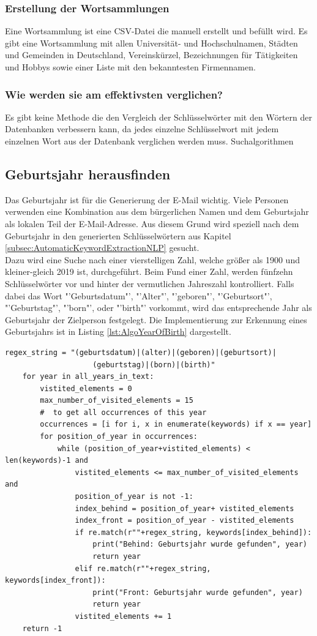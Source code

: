		\subsubsection{Erstellung der Wortsammlungen}	
		Eine Wortsammlung ist eine CSV-Datei die manuell erstellt und befüllt wird. Es gibt eine Wortsammlung mit allen Universität- und Hochschulnamen, Städten und Gemeinden in Deutschland, Vereinskürzel, Bezeichnungen für Tätigkeiten und Hobbys sowie einer Liste mit den bekanntesten Firmennamen. 
		\subsubsection{Wie werden sie am effektivsten verglichen?}
		Es gibt keine Methode die den Vergleich der Schlüsselwörter mit den Wörtern der Datenbanken verbessern kann, da jedes einzelne Schlüsselwort mit jedem einzelnen Wort aus der Datenbank verglichen werden muss. Suchalgorithmen
		
	\subsection{Geburtsjahr herausfinden}
	Das Geburtsjahr ist für die Generierung der E-Mail wichtig. Viele Personen verwenden eine Kombination aus dem bürgerlichen Namen und dem Geburtsjahr als lokalen Teil der E-Mail-Adresse. Aus diesem Grund wird speziell nach dem Geburtsjahr in den generierten Schlüsselwörtern aus Kapitel \ref{subsec:AutomaticKeywordExtractionNLP} gesucht.\\
	Dazu wird eine Suche nach einer vierstelligen Zahl, welche größer als 1900 und kleiner-gleich 2019 ist, durchgeführt. Beim Fund einer Zahl, werden  fünfzehn Schlüsselwörter vor und hinter der vermutlichen Jahreszahl kontrolliert. Falls dabei das Wort "'Geburtsdatum"', "'Alter"', "'geboren"', "'Geburtsort"', "'Geburtstag"', "'born"', oder "'birth"' vorkommt, wird das entsprechende Jahr als Geburtsjahr der Zielperson festgelegt. Die Implementierung zur Erkennung eines Geburtsjahrs ist in Listing \ref{lst:AlgoYearOfBirth} dargestellt.\\
	
	\begin{lstlisting}[caption=Geburtsdatum herauslesen,label={lst:AlgoYearOfBirth}]
	regex_string = "(geburtsdatum)|(alter)|(geboren)|(geburtsort)|	
					(geburtstag)|(born)|(birth)"
	for year in all_years_in_text:
		vistited_elements = 0
		max_number_of_visited_elements = 15
		#  to get all occurrences of this year
		occurrences = [i for i, x in enumerate(keywords) if x == year]
		for position_of_year in occurrences:
			while (position_of_year+vistited_elements) < len(keywords)-1 and
				vistited_elements <= max_number_of_visited_elements and
				position_of_year is not -1:
				index_behind = position_of_year+ vistited_elements
				index_front = position_of_year - vistited_elements
				if re.match(r""+regex_string, keywords[index_behind]):
					print("Behind: Geburtsjahr wurde gefunden", year)
					return year
				elif re.match(r""+regex_string, keywords[index_front]):
					print("Front: Geburtsjahr wurde gefunden", year)
					return year
				vistited_elements += 1
	return -1
	\end{lstlisting} 
